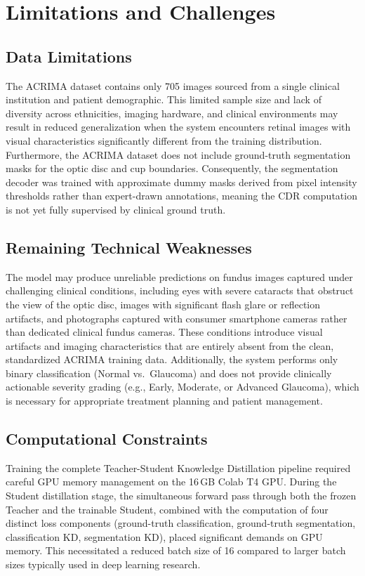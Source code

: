 \documentclass[conference]{IEEEtran}
\begin{document}
\section{Limitations and Challenges}

\subsection{Data Limitations}
The ACRIMA dataset contains only 705 images sourced from a single clinical institution and patient demographic. This limited sample size and lack of diversity across ethnicities, imaging hardware, and clinical environments may result in reduced generalization when the system encounters retinal images with visual characteristics significantly different from the training distribution. Furthermore, the ACRIMA dataset does not include ground-truth segmentation masks for the optic disc and cup boundaries. Consequently, the segmentation decoder was trained with approximate dummy masks derived from pixel intensity thresholds rather than expert-drawn annotations, meaning the CDR computation is not yet fully supervised by clinical ground truth.

\subsection{Remaining Technical Weaknesses}
The model may produce unreliable predictions on fundus images captured under challenging clinical conditions, including eyes with severe cataracts that obstruct the view of the optic disc, images with significant flash glare or reflection artifacts, and photographs captured with consumer smartphone cameras rather than dedicated clinical fundus cameras. These conditions introduce visual artifacts and imaging characteristics that are entirely absent from the clean, standardized ACRIMA training data. Additionally, the system performs only binary classification (Normal vs.\ Glaucoma) and does not provide clinically actionable severity grading (e.g., Early, Moderate, or Advanced Glaucoma), which is necessary for appropriate treatment planning and patient management.

\subsection{Computational Constraints}
Training the complete Teacher-Student Knowledge Distillation pipeline required careful GPU memory management on the 16\,GB Colab T4 GPU. During the Student distillation stage, the simultaneous forward pass through both the frozen Teacher and the trainable Student, combined with the computation of four distinct loss components (ground-truth classification, ground-truth segmentation, classification KD, segmentation KD), placed significant demands on GPU memory. This necessitated a reduced batch size of 16 compared to larger batch sizes typically used in deep learning research.
\end{document}
